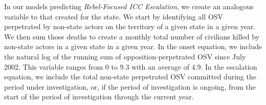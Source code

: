
In our models predicting \emph{Rebel-Focused ICC Escalation}, we create an analogous variable to that created for the state. We start by identifying all OSV perpetrated by non-state actors on the territory of a given state in a given year. We then sum those deaths to create a monthly total number of civilians killed by non-state actors in a given state in a given year. In the onset equation, we include the natural log of the running sum of opposition-perpetrated OSV since July 2002. This variable ranges from 0 to 9.3 with an average of 4.9. In the escalation equation, we include the total non-state perpetrated OSV committed during the period under investigation, or, if the period of investigation is ongoing, from the start of the period of investigation through the current year. 


